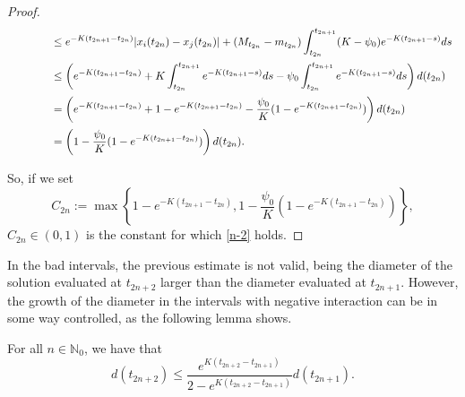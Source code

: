 \documentclass[a4paper,11pt,oneside]{article}
\begin{document}
\begin{proof}
$$\begin{array}{l}
			\vspace{0.2cm}\displaystyle{\hspace{1.3cm}\leq e^{-K(t_{2n+1}-t_{2n})}\lvert x_{i}(t_{2n})-x_{j}(t_{2n})\rvert +(M_{t_{2n}}-m_{t_{2n}})\int_{t_{2n}}^{t_{2n+1}}(K-\psi_{0})e^{-K(t_{2n+1}-s)}ds}\\
			\vspace{0.2cm}\displaystyle{\hspace{1.3cm}\leq \left(e^{-K(t_{2n+1}-t_{2n})} +K\int_{t_{2n}}^{t_{2n+1}}e^{-K(t_{2n+1}-s)}ds-\psi_{0}\int_{t_{2n}}^{t_{2n+1}}e^{-K(t_{2n+1}-s)}ds\right)d(t_{2n})}\\
			\vspace{0.2cm}\displaystyle{\hspace{1.3cm}= \left(e^{-K(t_{2n+1}-t_{2n})} +1-e^{-K(t_{2n+1}-t_{2n})}-\frac{\psi_{0}}{K}(1-e^{-K(t_{2n+1}-t_{2n})})\right)d(t_{2n})}\\
			\vspace{0.2cm}\displaystyle{\hspace{1.3cm}=\left(1-\frac{\psi_{0}}{K}(1-e^{-K(t_{2n+1}-t_{2n})})\right)d(t_{2n}).}
		\end{array}$$
		So, if we set \begin{equation}\label{cn}
			C_{2n}:=\max\left\{1-e^{-K(t_{2n+1}-t_{2n})},1-\frac{\psi_{0}}{K}(1-e^{-K(t_{2n+1}-t_{2n})})\right\},
		\end{equation}
		$C_{2n}\in (0,1)$ is the constant for which \eqref{n-2} holds.
	\end{proof}
In the bad intervals, the previous estimate is not valid, being the diameter of the solution evaluated at $t_{2n+2}$ larger than the diameter evaluated at $t_{2n+1}$. However, the growth of the diameter in the intervals with negative interaction can be in some way controlled, as the following lemma shows.\begin{lem}
	For all $n\in \mathbb{N}_{0}$, we have that
	\begin{equation}\label{boundgrowth}
		d(t_{2n+2})\leq \frac{e^{K(t_{2n+2}-t_{2n+1})}}{2-e^{K(t_{2n+2}-t_{2n+1})}}d(t_{2n+1}).
	\end{equation}
\end{lem} 
\end{document}
